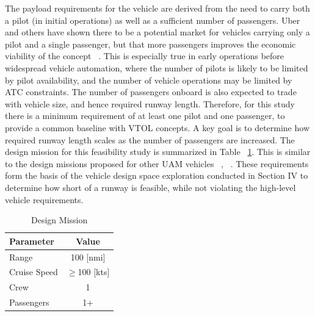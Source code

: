 \documentclass[]{aiaa-tc}%
\begin{document}
The payload requirements for the vehicle are derived from the need to carry both a pilot (in initial operations) as well as a sufficient number of passengers. Uber and others have shown there to be a potential market for vehicles carrying only a pilot and a single passenger, but that more passengers improves the economic viability of the concept ~\cite{Uber}.  This is especially true in early operations before widespread vehicle automation, where the number of pilots is likely to be limited by pilot availability, and the number of vehicle operations may be limited by ATC constraints.   The number of passengers onboard is also expected to trade with vehicle size, and hence required runway length.  Therefore, for this study there is a minimum requirement of at least one pilot and one passenger, to provide a common baseline with VTOL concepts.  A key goal is to determine how required runway length scales as the number of passengers are increased.  The design mission for this feasibility study is summarized in Table ~\ref{t:design_mission}.  This is similar to the design missions proposed for other UAM vehicles ~\cite{Uber}, ~\cite{Antcliff}.  These requirements form the basis of the vehicle design space exploration conducted in Section IV to determine how short of a runway is feasible, while not violating the high-level vehicle requirements. 


\begin{table}[H]
    \centering
    \caption{Design Mission}
    \label{t:design_mission}
    \begin{tabular}{l c}
    \toprule
    \toprule
    Parameter                                   & Value         \\ \hline
    Range                        & 100 [nmi]      \\
    Cruise Speed                      & $\ge$100 [kts]           \\
    Crew                         & 1  \\
    Passengers                & 1+ \\
    \bottomrule
\end{tabular}
\end{table}
\end{document}
